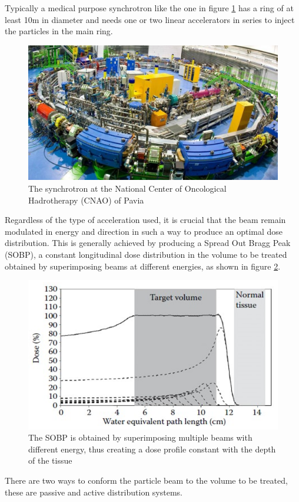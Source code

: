 Typically a medical purpose synchrotron like the one in figure \ref{fig:sincrotrone} has a ring of at least 10m in diameter and needs one or two linear accelerators in series to inject the particles in the main ring.
\begin{figure}[H]
	\centering
	\includegraphics[width=0.7\linewidth]{IMG/ch1/Sincrotrone}
	\caption{The synchrotron at the National Center of Oncological Hadrotherapy (CNAO) of Pavia}
	\label{fig:sincrotrone}
\end{figure}
\noindent Regardless of the type of acceleration used, it is crucial that the beam remain modulated in energy and direction in such a way to produce an optimal dose distribution. This is generally achieved by producing a Spread Out Bragg Peak (SOBP), a constant longitudinal dose distribution in the volume to be treated obtained by superimposing beams at different energies, as shown in figure \ref{fig:sobp}.
\begin{figure}[H]
	\centering
	\includegraphics[width=0.7\linewidth]{IMG/ch1/SOBP}
	\caption{The SOBP is obtained by superimposing multiple beams with different energy, thus creating a dose profile constant with the depth of the tissue}
	\label{fig:sobp}
\end{figure}
\noindent There are two ways to conform the particle beam to the volume to be treated, these are passive and active distribution systems.

